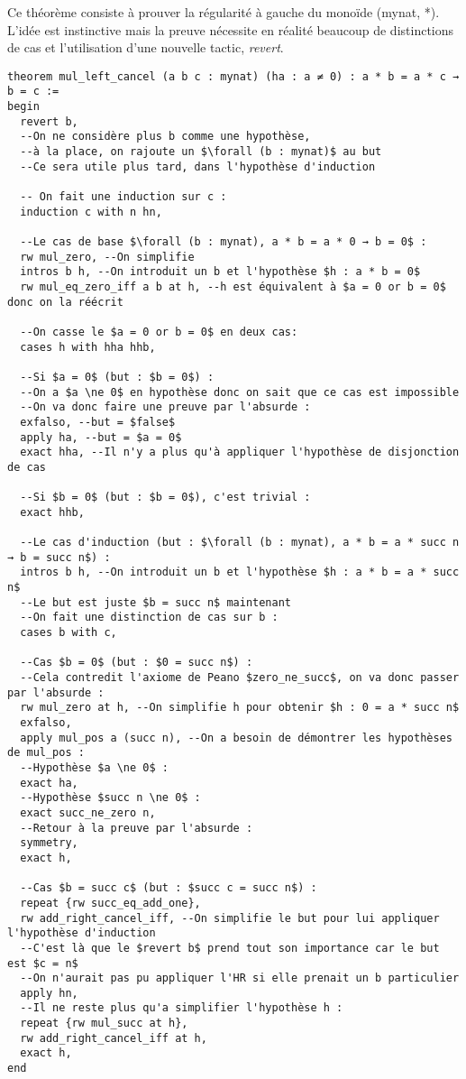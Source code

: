 Ce théorème consiste à prouver la régularité à gauche du monoïde (mynat, *).
L'idée est instinctive mais la preuve nécessite en réalité beaucoup de distinctions de cas et l'utilisation d'une nouvelle tactic, \textit{revert}.
\begin{verbatim}
theorem mul_left_cancel (a b c : mynat) (ha : a ≠ 0) : a * b = a * c → b = c :=
begin
  revert b,
  --On ne considère plus b comme une hypothèse,
  --à la place, on rajoute un $\forall (b : mynat)$ au but
  --Ce sera utile plus tard, dans l'hypothèse d'induction
  
  -- On fait une induction sur c :
  induction c with n hn,

  --Le cas de base $\forall (b : mynat), a * b = a * 0 → b = 0$ :
  rw mul_zero, --On simplifie
  intros b h, --On introduit un b et l'hypothèse $h : a * b = 0$
  rw mul_eq_zero_iff a b at h, --h est équivalent à $a = 0 or b = 0$ donc on la réécrit
  
  --On casse le $a = 0 or b = 0$ en deux cas:
  cases h with hha hhb,
  
  --Si $a = 0$ (but : $b = 0$) :
  --On a $a \ne 0$ en hypothèse donc on sait que ce cas est impossible
  --On va donc faire une preuve par l'absurde :
  exfalso, --but = $false$
  apply ha, --but = $a = 0$
  exact hha, --Il n'y a plus qu'à appliquer l'hypothèse de disjonction de cas
  
  --Si $b = 0$ (but : $b = 0$), c'est trivial :
  exact hhb,

  --Le cas d'induction (but : $\forall (b : mynat), a * b = a * succ n → b = succ n$) :
  intros b h, --On introduit un b et l'hypothèse $h : a * b = a * succ n$
  --Le but est juste $b = succ n$ maintenant
  --On fait une distinction de cas sur b :
  cases b with c,

  --Cas $b = 0$ (but : $0 = succ n$) :
  --Cela contredit l'axiome de Peano $zero_ne_succ$, on va donc passer par l'absurde :
  rw mul_zero at h, --On simplifie h pour obtenir $h : 0 = a * succ n$
  exfalso,
  apply mul_pos a (succ n), --On a besoin de démontrer les hypothèses de mul_pos :
  --Hypothèse $a \ne 0$ :
  exact ha,
  --Hypothèse $succ n \ne 0$ :
  exact succ_ne_zero n,
  --Retour à la preuve par l'absurde :
  symmetry,
  exact h,

  --Cas $b = succ c$ (but : $succ c = succ n$) :
  repeat {rw succ_eq_add_one},
  rw add_right_cancel_iff, --On simplifie le but pour lui appliquer l'hypothèse d'induction
  --C'est là que le $revert b$ prend tout son importance car le but est $c = n$
  --On n'aurait pas pu appliquer l'HR si elle prenait un b particulier
  apply hn,
  --Il ne reste plus qu'a simplifier l'hypothèse h :
  repeat {rw mul_succ at h},
  rw add_right_cancel_iff at h,
  exact h,
end
\end{verbatim}

